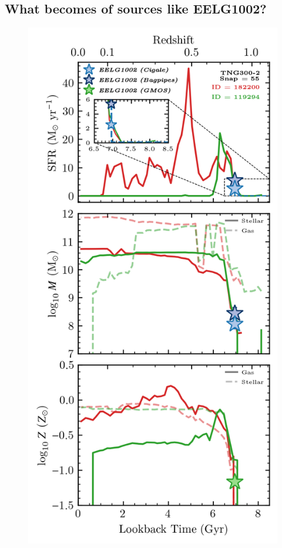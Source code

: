 \documentclass[twocolumn,tight,times,linenumbers]{aastex631}
\begin{document}
		
	\subsection{What becomes of sources like EELG1002?}

        \begin{figure}
		\centering
		\includegraphics[width=\columnwidth]{figures/Illustris_Analogs.png}

\end{figure}
\end{document}
